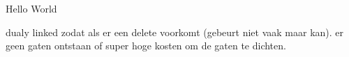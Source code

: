 \documentclass{article}
\begin{document}
Hello World

dualy linked zodat als er een delete voorkomt (gebeurt niet vaak maar kan).
er geen gaten ontstaan of super hoge kosten om de gaten te dichten.
\end{document}
